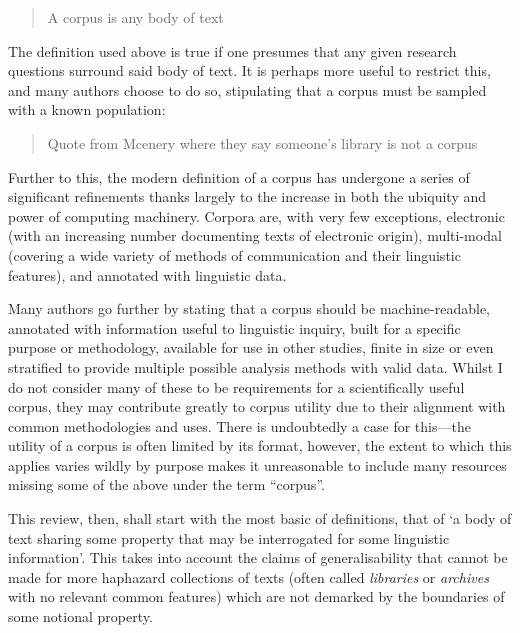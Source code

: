 \begin{quote}
A corpus is any body of text
\end{quote}

The definition used above is true if one presumes that any given research questions surround said body of text.  It is perhaps more useful to restrict this, and many authors choose to do so, stipulating that a corpus must be sampled with a known population:

\begin{quote}
Quote from Mcenery where they say someone's library is not a corpus
\end{quote}


Further to this, the modern definition of a corpus has undergone a series of significant refinements thanks largely to the increase in both the ubiquity and power of computing machinery.  Corpora are, with very few exceptions, electronic (with an increasing number documenting texts of electronic origin), multi-modal (covering a wide variety of methods of communication and their linguistic features), and annotated with linguistic data.

Many authors go further by stating that a corpus should be machine-readable, annotated with information useful to linguistic inquiry, built for a specific purpose or methodology, available for use in other studies, finite in size or even stratified to provide multiple possible analysis methods with valid data.  Whilst I do not consider many of these to be requirements for a scientifically useful corpus, they may contribute greatly to corpus utility due to their alignment with common methodologies and uses.  There is undoubtedly a case for this---the utility of a corpus is often limited by its format, however, the extent to which this applies varies wildly by purpose makes it unreasonable to include many resources missing some of the above under the term ``corpus''.



This review, then, shall start with the most basic of definitions, that of `a body of text sharing some property that may be interrogated for some linguistic information'.  This takes into account the claims of generalisability that cannot be made for more haphazard collections of texts (often called \textsl{libraries} or \textsl{archives} with no relevant common features) which are not demarked by the boundaries of some notional property.










